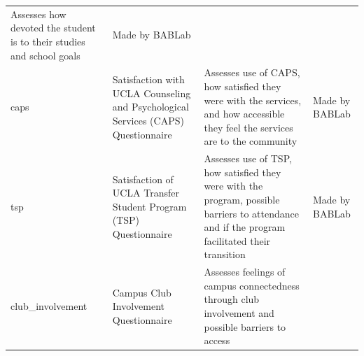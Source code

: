 \documentclass[]{book}
\begin{document}
\begin{longtable}[]{@{}llll@{}}
\begin{minipage}[t]{0.22\columnwidth}
Assesses how devoted the student is to their studies and school goals\strut
\end{minipage} & \begin{minipage}[t]{0.18\columnwidth}\raggedright
Made by BABLab\strut
\end{minipage}\tabularnewline
\begin{minipage}[t]{0.22\columnwidth}\raggedright
caps\strut
\end{minipage} & \begin{minipage}[t]{0.27\columnwidth}\raggedright
Satisfaction with UCLA Counseling and Psychological Services (CAPS) Questionnaire\strut
\end{minipage} & \begin{minipage}[t]{0.22\columnwidth}\raggedright
Assesses use of CAPS, how satisfied they were with the services, and how accessible they feel the services are to the community\strut
\end{minipage} & \begin{minipage}[t]{0.18\columnwidth}\raggedright
Made by BABLab\strut
\end{minipage}\tabularnewline
\begin{minipage}[t]{0.22\columnwidth}\raggedright
tsp\strut
\end{minipage} & \begin{minipage}[t]{0.27\columnwidth}\raggedright
Satisfaction of UCLA Transfer Student Program (TSP) Questionnaire\strut
\end{minipage} & \begin{minipage}[t]{0.22\columnwidth}\raggedright
Assesses use of TSP, how satisfied they were with the program, possible barriers to attendance and if the program facilitated their transition\strut
\end{minipage} & \begin{minipage}[t]{0.18\columnwidth}\raggedright
Made by BABLab\strut
\end{minipage}\tabularnewline
\begin{minipage}[t]{0.22\columnwidth}\raggedright
club\_involvement\strut
\end{minipage} & \begin{minipage}[t]{0.27\columnwidth}\raggedright
Campus Club Involvement Questionnaire\strut
\end{minipage} & \begin{minipage}[t]{0.22\columnwidth}\raggedright
Assesses feelings of campus connectedness through club involvement and possible barriers to access\strut
\end{minipage} & \begin{minipage}[t]{0.18\columnwidth}\raggedright

\end{minipage}
\end{longtable}
\end{document}
